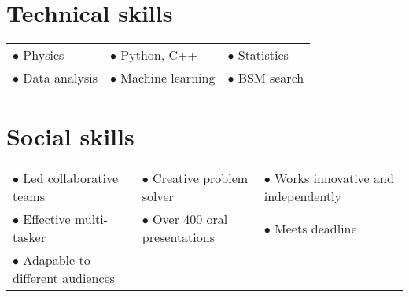 \section{Technical skills}


\begin{tabularx}{\textwidth}{p{} p{}  p{}}
$\bullet$ Physics & $\bullet$ Python, C++ & $\bullet$ Statistics \\
$\bullet$ Data analysis & $\bullet$ Machine learning &  $\bullet$ BSM search \\  
    
\end{tabularx}

\section{Social skills}
\begin{tabularx}{\textwidth}{p{} p{}  p{}}
$\bullet$ Led collaborative teams & $\bullet$ Creative problem solver & $\bullet$ Works innovative  and independently\\
    $\bullet$ Effective multi-tasker & $\bullet$ Over 400 oral presentations & $\bullet$ Meets deadline \\
    $\bullet$ Adapable to different audiences &  & \\
    
\end{tabularx}



